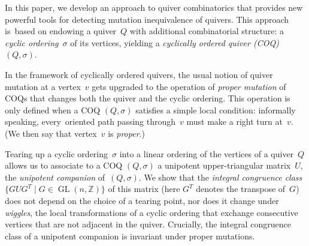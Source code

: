 \documentclass[11pt, letterpaper]{amsart}
\theoremstyle{definition}
\numberwithin{equation}{section}
\def\ZZ{{\mathbb Z}}
\def\GL{{\operatorname{GL}}}
\begin{document}
In this paper, we develop an approach to quiver combinatorics 
that provides new powerful tools for detecting mutation inequivalence of quivers. 
This approach is~based on   
endowing a quiver~$Q$ with additional combinatorial structure:
a \emph{cyclic ordering}~$\sigma$ of its vertices, 
yielding a \emph{cyclically ordered quiver (COQ)} $(Q,\sigma)$. 

In the framework of cyclically ordered quivers, 
the usual notion of quiver mutation at a vertex~$v$ gets upgraded 
to the operation of \emph{proper mutation} of COQs 
that changes both the quiver and the cyclic ordering. 
This operation is only defined when a COQ $(Q,\sigma)$ satisfies a simple local condition: 
informally speaking, every~oriented path %
passing through~$v$ must make a right turn at~$v$.
(We then say that vertex~$v$ is \emph{proper}.) 


Tearing up a cyclic ordering~$\sigma$ into a linear ordering of the vertices of a quiver~$Q$ allows us to 
associate to a COQ $(Q, \sigma)$ a unipotent upper-triangular matrix~$U$,  
the \emph{unipotent companion} of~${(Q,\sigma)}$. 
We  show that the \emph{integral congruence class} 
${\{G U G^T \mid G\in\GL(n,\ZZ)\}}$
of this matrix (here $G^T$ denotes the transpose of~$G$) does not depend on the choice of a tearing point,
nor does it change under \emph{wiggles}, the local transformations of a cyclic ordering that
exchange consecutive vertices that are not adjacent in the quiver. 
Crucially, the integral congruence class of a unipotent companion is invariant under proper mutations.
\end{document}
